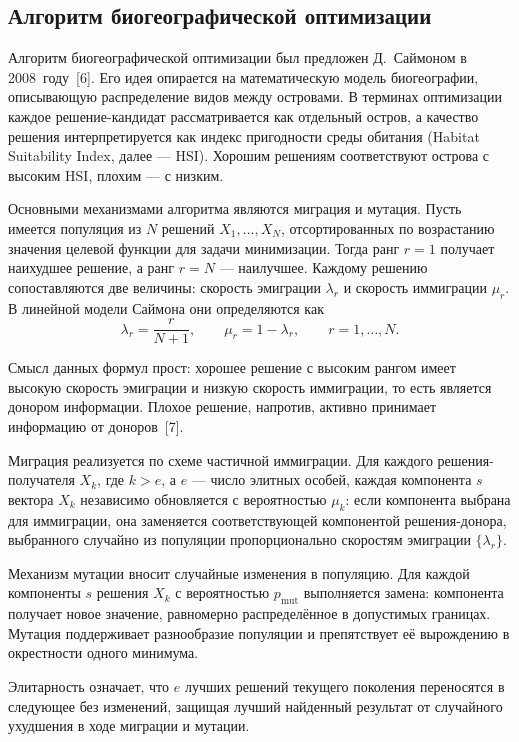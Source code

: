 \documentclass[14pt, russian]{scrartcl}
\begin{document}
\subsection{Алгоритм биогеографической оптимизации}

Алгоритм биогеографической оптимизации был предложен Д.~Саймоном в
2008~году~[6]. Его идея опирается на математическую модель биогеографии,
описывающую распределение видов между островами. В терминах оптимизации
каждое решение-кандидат рассматривается как отдельный остров, а качество
решения интерпретируется как индекс пригодности среды обитания (Habitat
Suitability Index, далее --- HSI). Хорошим решениям соответствуют острова с высоким
HSI, плохим --- с низким.

Основными механизмами алгоритма являются миграция и мутация. Пусть
имеется популяция из $N$ решений $X_1, \dots, X_N$, отсортированных по
возрастанию значения целевой функции для задачи минимизации. Тогда
ранг $r = 1$ получает наихудшее решение, а ранг $r = N$ --- наилучшее.
Каждому решению сопоставляются две величины: скорость эмиграции
$\lambda_r$ и скорость иммиграции $\mu_r$. В линейной
модели Саймона они определяются как
\begin{equation}
    \lambda_r = \frac{r}{N+1}, \qquad \mu_r = 1 - \lambda_r,
    \qquad r = 1, \dots, N.
\end{equation}

Смысл данных формул прост: хорошее решение с высоким рангом имеет высокую
скорость эмиграции и низкую скорость иммиграции, то есть является
донором информации. Плохое решение, напротив, активно принимает
информацию от доноров~[7].

Миграция реализуется по схеме частичной иммиграции. Для каждого
решения-получателя $X_k$, где $k > e$, а $e$ --- число элитных особей,
каждая компонента $s$ вектора $X_k$ независимо обновляется с
вероятностью $\mu_k$: если компонента выбрана для иммиграции, она
заменяется соответствующей компонентой решения-донора, выбранного
случайно из популяции пропорционально скоростям эмиграции
$\{\lambda_r\}$.

Механизм мутации вносит случайные изменения в популяцию. Для каждой
компоненты $s$ решения $X_k$ с вероятностью $p_{\text{mut}}$
выполняется замена: компонента получает новое значение, равномерно
распределённое в допустимых границах. Мутация поддерживает разнообразие
популяции и препятствует её вырождению в окрестности одного минимума.

Элитарность означает, что $e$ лучших решений текущего поколения
переносятся в следующее без изменений, защищая лучший найденный результат
от случайного ухудшения в ходе миграции и мутации.
\end{document}
